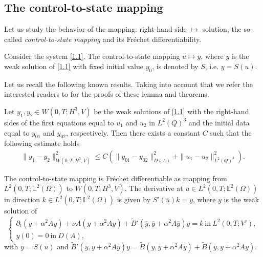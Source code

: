 \documentclass[reqno]{amsart}
\begin{document}
	\subsection{The control-to-state mapping}
	Let us study the behavior of the mapping: right-hand side $ \mapsto $ solution, the so-called \textit{control-to-state mapping} and its Fréchet differentiability.
	\begin{definition} \label{Smapping}
		Consider the system \eqref{1.1}. The control-to-state mapping $ u \mapsto y $, where $ y $ is the weak solution of \eqref{1.1} with fixed initial value $ y_0$, is denoted by $ S $, i.e. $ y = S(u) $.
	\end{definition}
	Let us recall the following known results. Taking into account that we refer the interested readers to \cite{AG2024} for the proofs of these lemma and theorems.
	\begin{lemma}\label{LipchitzS}
		Let $y_1,y_2 \in W(0,T;H^3,V)$ be the weak solutions of \eqref{1.1} with the right-hand sides of the first equations equal to $u_1$ and $u_2$ in $L^2(Q)^3$ and the initial data equal to $y_{01}$ and $y_{02}$, respectively. Then there exists a constant $C$ such that the following estimate holds
		\begin{align}
			\| y_1 - y_2 \|^2_{W(0,T;H^3,V)} \leq C\left(\|y_{01} - y_{02}\|_{D(A)}^2 + \| u_1 - u_2\|_{L^2(Q)^3}^2 \right).
		\end{align}
	\end{lemma}
	
	\begin{theorem}\label{1stS}
		The control-to-state mapping is Fréchet differentiable as mapping from $ L^2(0,T;\mathbb{L}^2(\Omega)) $ to $ W(0,T;H^3,V) $. The derivative at $ \overline{u} \in L^2(0,T;\mathbb{L}^2(\Omega)) $ in direction $ k \in L^2(0,T;\mathbb{L}^2(\Omega)) $ is given by $ S'(\overline{u} )k = y $, where $ y $ is the weak solution of 
		\begin{equation} \label{linearized eq}
			\begin{cases}
				\partial_{t} (y + \alpha^{2} Ay) + \nu A(y + \alpha^{2} Ay) + \widetilde{B}'(\overline{y}, \overline{y}+\alpha^2 A \overline{y})y = k \ \text{in} \ L^2(0,T;V'),\\
				y(0)=0 \ \text{in} \ D(A),
			\end{cases}
		\end{equation}
		with $ \overline{y} = S(\overline{u}) $ and $ \widetilde{B}'(\overline{y}, \overline{y}+\alpha^2 A \overline{y})y = \widetilde{B}(y, \overline{y} + \alpha^{2} A \overline{y}) + \widetilde{B}(\overline{y}, y + \alpha^{2}A y) $.
	\end{theorem}
	
\end{document}
